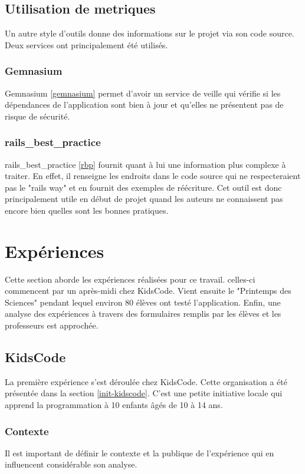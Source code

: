 \subsection{Utilisation de metriques}%
Un autre style d'outils donne des informations sur le projet via son code source. Deux services ont principalement été utilisés.

\subsubsection{Gemnasium}
Gemnasium \ref{gemnasium} permet d'avoir un service de veille qui vérifie si les dépendances de l'application sont bien à jour et qu'elles ne présentent pas de risque de sécurité.

\subsubsection{rails\_best\_practice}
rails\_best\_practice \ref{rbp} fournit quant à lui une information plus complexe à traiter. En effet, il renseigne les endroits dans le code source qui ne respecteraient pas le "rails way" et en fournit des exemples de réécriture. Cet outil est donc principalement utile en début de projet quand les auteurs ne connaissent pas encore bien quelles sont les bonnes pratiques.

\section{Expériences}
Cette section aborde les expériences réalisées pour ce travail. celles-ci commencent par un après-midi chez KidsCode. Vient ensuite le "Printemps des Sciences" pendant lequel environ 80 élèves ont testé l'application. Enfin, une analyse des expériences à travers des formulaires remplis par les élèves et les professeurs est approchée.

\subsection{KidsCode}
\label{kidscode}
La première expérience s'est déroulée chez KidsCode. Cette organisation a été présentée dans la section \ref{init-kidscode}. C'est une petite initiative locale qui apprend la programmation à 10 enfants âgés de 10 à 14 ans.

\subsubsection{Contexte}
\label{context-kidscode}
Il est important de définir le contexte et la publique de l'expérience qui en influencent considérable son analyse.

